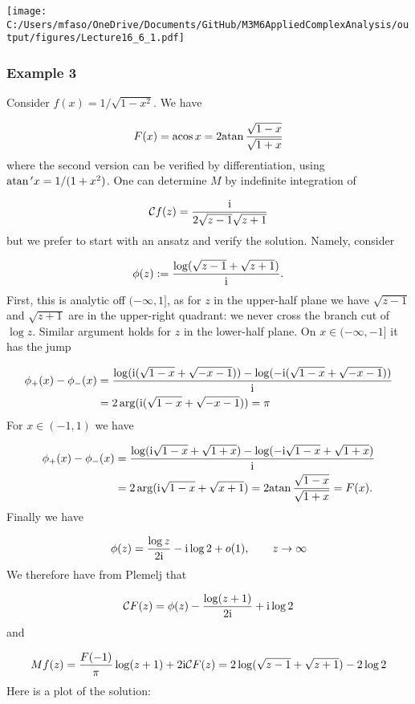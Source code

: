 \documentclass[12pt,a4paper]{article}
\def\I{ {\rm i} }
\def\CC{ {\cal C} }
\def\acos{ {\rm acos}\, }
\def\atan{ {\rm atan}\, }
\begin{document}
\texttt{[image: C:/Users/mfaso/OneDrive/Documents/GitHub/M3M6AppliedComplexAnalysis/output/figures/Lecture16\_6\_1.pdf]}

\subsubsection{Example 3}
Consider $f(x) = 1/\sqrt{1-x^2}$. We have

\[
F(x) = \acos x = 2 \atan {\sqrt{1-x} \over \sqrt{1+x}}
\]
where the second version can be verified by differentiation, using $\atan' x = 1/(1+x^2)$. One can determine $M$ by indefinite integration of

\[
\CC f(z) = {\I \over 2 \sqrt{z-1}\sqrt{z+1}}
\]
but we prefer to start with an ansatz and verify the solution. Namely, consider

\[
\phi(z) := {\log(\sqrt{z-1} + \sqrt{z+1}) \over \I}.
\]
First, this is analytic off $(-\infty,1]$, as for $z$ in the upper-half plane we have $\sqrt{z-1}$ and $\sqrt{z+1}$ are  in the upper-right quadrant: we never cross the branch cut of $\log z$. Similar argument holds for $z$ in the lower-half plane. On $x \in (-\infty,-1]$ it has the jump


\begin{align*}
\phi_+(x) - \phi_-(x) &= {\log(\I (\sqrt{1-x} + \sqrt{-x-1})) -  \log(-\I (\sqrt{1-x} + \sqrt{-x-1})) \over \I} \\
& =
        2 \arg(\I (\sqrt{1-x} + \sqrt{-x-1})) = \pi
\end{align*}
For $x \in (-1,1)$ we have


\begin{align*}
\phi_+(x) - \phi_-(x) &= {\log(\I \sqrt{1-x} + \sqrt{1+x}) -  \log(-\I \sqrt{1-x} + \sqrt{1+x}) \over \I} \\
& =
        2 \arg(\I \sqrt{1-x} + \sqrt{x+1}) = 2 \atan {\sqrt{1-x} \over \sqrt{1+x}} = F(x).
\end{align*}
Finally we have

\[
\phi(z) = {\log z \over 2 \I} - \I \log 2 + o(1), \qquad z \to \infty
\]
We therefore have from Plemelj that

\[
\CC F(z) = \phi(z) - {\log(z+1) \over 2 \I} + \I \log 2
\]
and

\[
Mf(z) = {F(-1)\over \pi} \log(z+1)  + 2 \I \CC F(z) =2\log(\sqrt{z-1} + \sqrt{z+1}) -2 \log 2
\]
Here is a plot of the solution:
\end{document}
